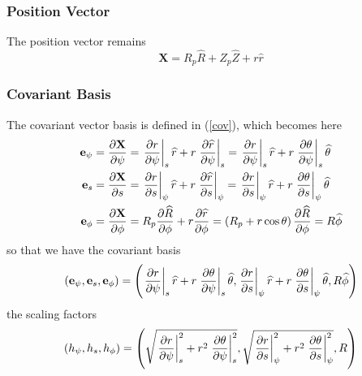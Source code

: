 \subsubsection{Position Vector}

The position vector remains 
\begin{equation}
\mathbf{X}=R_{p}\widehat{R}+Z_{p}\widehat{Z}+r\widehat{r}
\end{equation}

\subsubsection{Covariant Basis}

The covariant vector basis is defined in (\ref{cov}), which becomes here 
\begin{align}
\mathbf{e}_{\psi} & =\frac{\partial\mathbf{X}}{\partial\psi}=\left. \frac{%
\partial r}{\partial\psi}\right| _{s}\widehat{r}+r\left. \frac{\partial%
\widehat{r}}{\partial\psi}\right| _{s}=\left. \frac{\partial r}{\partial\psi}%
\right| _{s}\widehat{r}+r\left. \frac{\partial\theta }{\partial\psi}\right|
_{s}\widehat{\theta} \\
\mathbf{e}_{s} & =\frac{\partial\mathbf{X}}{\partial s}=\left. \frac{%
\partial r}{\partial s}\right| _{\psi}\widehat{r}+r\left. \frac{\partial%
\widehat{r}}{\partial s}\right| _{\psi}=\left. \frac{\partial r}{\partial s}%
\right| _{\psi}\widehat{r}+r\left. \frac{\partial\theta }{\partial s}\right|
_{\psi}\widehat{\theta} \\
\mathbf{e}_{\phi} & =\frac{\partial\mathbf{X}}{\partial\phi}=R_{p}\frac{%
\partial\widehat{R}}{\partial\phi}+r\frac{\partial\widehat{r}}{\partial\phi}%
=\left( R_{p}+r\cos\theta\right) \frac{\partial\widehat{R}}{\partial\phi}=R%
\widehat{\phi}
\end{align}
so that we have the covariant basis 
\begin{equation}
\left( \mathbf{e}_{\psi},\mathbf{e}_{s},\mathbf{e}_{\phi}\right) =\left(
\left. \frac{\partial r}{\partial\psi}\right| _{s}\widehat{r}+r\left. \frac{%
\partial\theta}{\partial\psi}\right| _{s}\widehat{\theta},\left. \frac{%
\partial r}{\partial s}\right| _{\psi}\widehat{r}+r\left. \frac{%
\partial\theta}{\partial s}\right| _{\psi}\widehat{\theta},R\widehat{\phi}%
\right)  \label{covpsis}
\end{equation}
the scaling factors 
\begin{equation}
\left( h_{\psi},h_{s},h_{\phi}\right) =\left( \sqrt{\left. \frac{\partial r}{%
\partial\psi}\right| _{s}^{2}+r^{2}\left. \frac{\partial\theta}{\partial\psi}%
\right| _{s}^{2}},\sqrt{\left. \frac{\partial r}{\partial s}\right|
_{\psi}^{2}+r^{2}\left. \frac{\partial\theta}{\partial s}\right| _{\psi}^{2}}%
,R\right)
\end{equation}
